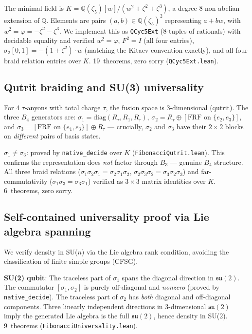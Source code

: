 \documentclass[12pt]{article}
\newcommand{\lean}[1]{\texttt{#1}}
\newcommand{\nativedecide}{\texttt{native\_decide}}
\begin{document}
The minimal field is $K = \mathbb{Q}(\zeta_5)[w]/(w^2 + \zeta^2 +
\zeta^3)$, a degree-8 non-abelian extension of $\mathbb{Q}$.
Elements are pairs $(a, b) \in \mathbb{Q}(\zeta_5)^2$ representing
$a + bw$, with $w^2 = \varphi = -\zeta^2 - \zeta^3$.  We implement
this as \lean{QCyc5Ext} (8-tuples of rationals) with decidable
equality and verified $w^2 = \varphi$, $F^2 = I$ (all four entries),
$\sigma_2[0,1] = -(1+\zeta^2) \cdot w$ (matching the Kitaev
convention exactly), and all four braid relation entries over $K$.
19~theorems, zero sorry (\lean{QCyc5Ext.lean}).

\subsection{Qutrit braiding and SU(3) universality}

For 4 $\tau$-anyons with total charge $\tau$, the fusion space is
3-dimensional (qutrit).  The three $B_4$ generators are:
$\sigma_1 = \mathrm{diag}(R_\tau, R_1, R_\tau)$,
$\sigma_2 = R_\tau \oplus [\text{FRF on } \{e_2, e_3\}]$, and
$\sigma_3 = [\text{FRF on } \{e_1, e_3\}] \oplus R_\tau$ --- crucially,
$\sigma_2$ and $\sigma_3$ have their $2 \times 2$ blocks on
\emph{different} pairs of basis states.

\textbf{$\sigma_1 \neq \sigma_3$}: proved by \nativedecide{} over $K$
(\lean{FibonacciQutrit.lean}).  This confirms the representation does
\emph{not} factor through $B_3$ --- genuine $B_4$ structure.
All three braid relations ($\sigma_1\sigma_2\sigma_1 = \sigma_2\sigma_1
\sigma_2$, $\sigma_2\sigma_3\sigma_2 = \sigma_3\sigma_2\sigma_3$) and
far-commutativity ($\sigma_1\sigma_3 = \sigma_3\sigma_1$) verified as
$3 \times 3$ matrix identities over $K$.  6~theorems, zero sorry.

\subsection{Self-contained universality proof via Lie algebra spanning}

We verify density in SU($n$) via the Lie algebra rank condition,
avoiding the classification of finite simple groups (CFSG).

\textbf{SU(2) qubit}: The traceless part of $\sigma_1$ spans the
diagonal direction in $\mathfrak{su}(2)$. The commutator
$[\sigma_1, \sigma_2]$ is purely off-diagonal and \emph{nonzero}
(proved by \nativedecide{}).  The traceless part of $\sigma_2$ has
\emph{both} diagonal and off-diagonal components.  Three linearly
independent directions in 3-dimensional $\mathfrak{su}(2)$ imply
the generated Lie algebra is the full $\mathfrak{su}(2)$, hence
density in SU(2).  9~theorems (\lean{FibonacciUniversality.lean}).
\end{document}
